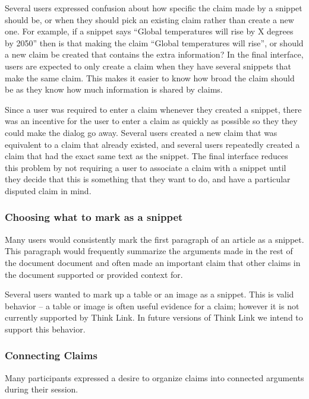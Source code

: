 \documentclass{chi2009}
\newcommand{\todo}[1]{}
\begin{document}
Several users expressed confusion about how specific the claim made by a snippet should be, or when they should pick an existing claim rather than create a new one. For example, if a snippet says ``Global temperatures will rise by X degrees by 2050'' then is that making the claim ``Global temperatures will rise'', or should a new claim be created that contains the extra information? In the final interface, users are expected to only create a claim when they have several snippets that make the same claim. This makes it easier to know how broad the claim should be as they know how much information is shared by claims.

Since a user was required to enter a claim whenever they created a snippet, there was an incentive for the user to enter a claim as quickly as possible so they they could make the dialog go away. Several users created a new claim that was equivalent to a claim that already existed, and several users repeatedly created a claim that had the exact same text as the snippet. The final interface reduces this problem by not requiring a user to associate a claim with a snippet until they decide that this is something that they want to do, and have a particular disputed claim in mind.

\todo{Need to do some kind of evaluation to show that the new interface solves these problems}


\subsubsection{Choosing what to mark as a snippet}

Many users would consistently mark the first paragraph of an article as a snippet. This paragraph would frequently summarize the arguments made in the rest of the document document and often made an important claim that other claims in the document supported or provided context for. 

Several users wanted to mark up a table or an image as a snippet. This is valid behavior -- a table or image is often useful evidence for a claim; however it is not currently supported by Think Link. In future versions of Think Link we intend to support this behavior.


\subsubsection{Connecting Claims}

Many participants expressed a desire to organize claims into connected arguments during their session. 
\end{document}
